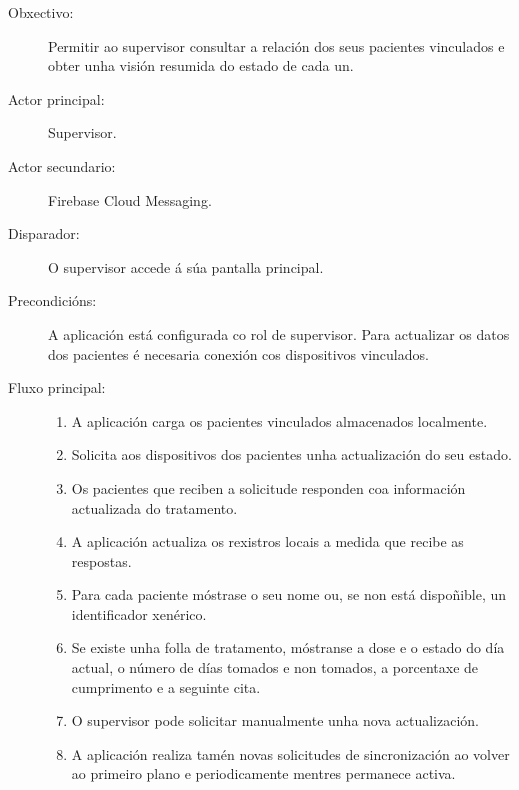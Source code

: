 \begin{description}

\item[Obxectivo:] Permitir ao supervisor consultar a relación dos seus pacientes
vinculados e obter unha visión resumida do estado de cada un.

\item[Actor principal:] Supervisor.

\item[Actor secundario:] Firebase Cloud Messaging.

\item[Disparador:] O supervisor accede á súa pantalla principal.

\item[Precondicións:] A aplicación está configurada co rol de supervisor. Para
actualizar os datos dos pacientes é necesaria conexión cos dispositivos
vinculados.

\item[Fluxo principal:] \hfill
\begin{enumerate}
    \item A aplicación carga os pacientes vinculados almacenados localmente.

    \item Solicita aos dispositivos dos pacientes unha actualización do seu
    estado.

    \item Os pacientes que reciben a solicitude responden coa información
    actualizada do tratamento.

    \item A aplicación actualiza os rexistros locais a medida que recibe as
    respostas.

    \item Para cada paciente móstrase o seu nome ou, se non está dispoñible, un
    identificador xenérico.

    \item Se existe unha folla de tratamento, móstranse a dose e o estado do día
    actual, o número de días tomados e non tomados, a porcentaxe de cumprimento
    e a seguinte cita.

    \item O supervisor pode solicitar manualmente unha nova actualización.

    \item A aplicación realiza tamén novas solicitudes de sincronización ao
    volver ao primeiro plano e periodicamente mentres permanece activa.


\end{enumerate}
\end{description}
